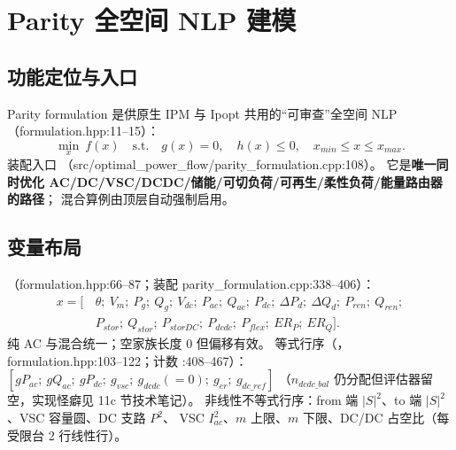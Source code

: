\section{Parity 全空间 NLP 建模}\label{sec:parity}

\subsection{功能定位与入口}
Parity formulation 是供原生 IPM 与 Ipopt 共用的“可审查”全空间 NLP
（formulation.hpp:11--15）：
\[
\min_x\ f(x)\quad \mathrm{s.t.}\quad g(x)=0,\quad h(x)\le 0,\quad x_{min}\le x\le x_{max}.
\]
装配入口 （src/optimal\_power\_flow/parity\_formulation.cpp:108）。
它是\textbf{唯一同时优化 AC/DC/VSC/DCDC/储能/可切负荷/可再生/柔性负荷/能量路由器的路径}；
混合算例由顶层自动强制启用。

\subsection{变量布局}
（formulation.hpp:66--87；装配 parity\_formulation.cpp:338--406）：
\begin{align*}
x=[\,&\theta;\ V_m;\ P_g;\ Q_g;\ V_{dc};\ P_{ac};\ Q_{ac};\ P_{dc};\ \Delta P_d;\ \Delta Q_d;\
P_{ren};\ Q_{ren};\\
&P_{stor};\ Q_{stor};\ P_{storDC};\ P_{dcdc};\ P_{flex};\ ER_P;\ ER_Q].
\end{align*}
纯 AC 与混合统一；空家族长度 0 但偏移有效。
等式行序（，formulation.hpp:103--122；计数 :408--467）：
$[gP_{ac};\ gQ_{ac};\ gP_{dc};\ g_{vsc};\ g_{dcdc}(=0);\ g_{er};\ g_{dc\_ref}]$
（$n_{dcdc\_bal}$ 仍分配但评估器留空，实现怪癖见 11c 节技术笔记）。
非线性不等式行序：from 端 $|S|^2$、to 端 $|S|^2$、VSC 容量圆、DC 支路 $P^2$、
VSC $I_{ac}^2$、$m$ 上限、$m$ 下限、DC/DC 占空比（每受限台 2 行线性行）。

